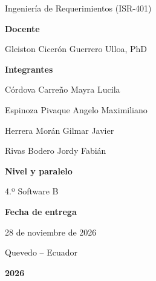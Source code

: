 \documentclass[12pt,a4paper]{article}
\begin{document}
\begin{titlepage}
    Ingeniería de Requerimientos (ISR-401)\par

    \vspace{0.3cm}

    {\bfseries\color{azul}Docente\par}

    Gleiston Cicerón Guerrero Ulloa, PhD\par

    \vspace{0.3cm}

    {\bfseries\color{azul}Integrantes\par}

    \vspace{0.1cm}

    Córdova Carreño Mayra Lucila\par
    Espinoza Pivaque Angelo Maximiliano\par
    Herrera Morán Gilmar Javier\par
    Rivas Bodero Jordy Fabián\par

    \vspace{0.3cm}

    {\bfseries\color{azul}Nivel y paralelo\par}

    4.º Software B\par

    \vspace{0.3cm}

    {\bfseries\color{azul}Fecha de entrega\par}

    28 de noviembre de 2026\par

    \vfill

    {\color{gris}Quevedo -- Ecuador\par}

    {\bfseries\color{azul}2026\par}

\end{titlepage}


\setcounter{page}{1}

\tableofcontents

\newpage

\end{document}
